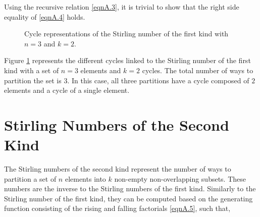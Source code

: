 Using the recursive relation \eqref{eqnA.3}, it is trivial to show that the right side equality of \eqref{eqnA.4} holds.

\begin{figure}[!htbp]
\centering
{}
\caption{Cycle representations of the Stirling number of the first kind with $n=3$ and $k=2$.}
\label{figA.1}
\end{figure}

Figure \ref{figA.1} represents the different cycles linked to the Stirling number of the first kind with a set of $n=3$ elements and $k=2$ cycles. The total number of ways to partition the set is $3$. In this case, all three partitions have a cycle composed of $2$ elements and a cycle of a single element.

\section{Stirling Numbers of the Second Kind}

The Stirling numbers of the second kind represent the number of ways to partition a set of $n$ elements into $k$ non-empty non-overlapping subsets. These numbers are the inverse to the Stirling numbers of the first kind. Similarly to the Stirling number of the first kind, they can be computed based on the generating function consisting of the rising and falling factorials \eqref{eqnA.5}, such that,

